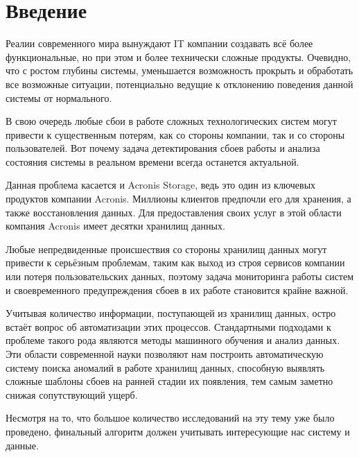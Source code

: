 \documentclass[14pt, a4paper]{extarticle}
\begin{document}
	\newpage
	\tableofcontents
	
	\newpage	
	\section{Введение}
	Реалии современного мира вынуждают IT компании создавать всё более функциональные, но при этом и более технически сложные продукты. Очевидно, что с ростом глубины системы, уменьшается возможность прокрыть и обработать все возможные ситуации, потенциально ведущие к отклонению поведения данной системы от нормального.
	
	В свою очередь любые сбои в работе сложных технологических систем могут привести к существенным потерям, как со стороны компании, так и со стороны пользователей. Вот почему задача детектирования сбоев работы и анализа состояния системы в реальном времени всегда останется актуальной.
	
	Данная проблема касается и Acronis Storage, ведь это один из ключевых продуктов компании Acronis. Миллионы клиентов предпочли его для хранения, а также восстановления данных. Для предоставления своих услуг в этой области компания Acronis имеет десятки хранилищ данных. 
	
	Любые непредвиденные происшествия со стороны хранилищ данных могут привести к серьёзным проблемам, таким как выход из строя сервисов компании или потеря пользовательских данных, поэтому задача мониторинга работы систем и своевременного предупреждения сбоев в их работе становится крайне важной. 
	
	Учитывая количество информации, поступающей из хранилищ данных, остро встаёт вопрос об автоматизации этих процессов. Стандартными подходами к проблеме такого рода являются методы машинного обучения и анализ данных. Эти области современной науки позволяют нам построить автоматическую систему поиска аномалий в работе хранилищ данных, способную выявлять сложные шаблоны сбоев на ранней стадии их появления, тем самым заметно снижая сопутствующий ущерб. 
	
	Несмотря на то, что большое количество исследований на эту тему уже  было проведено, финальный алгоритм должен учитывать интересующие нас систему и данные.

	\newpage
\end{document}

